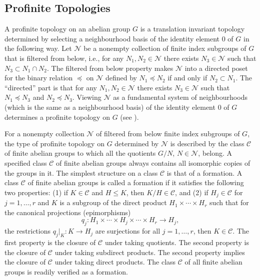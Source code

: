 \documentclass{amsart}
\theoremstyle{plain}
\theoremstyle{definition}
\theoremstyle{remark}
\begin{document}
\subsection{Profinite Topologies}

A profinite topology on an abelian group $G$ is a translation invariant topology determined by selecting a neighbourhood basis of the identity element $0$ of $G$ in the following way. Let ${\mathcal N}$ be a nonempty collection of finite index subgroups of $G$ that is filtered from below, i.e., for any $N_1,N_2\in{\mathcal N}$ there exists $N_3\in{\mathcal N}$ such that $N_3\subset N_1\cap N_2$. The filtered from below property makes ${\mathcal N}$ into a directed poset for the binary relation $\preceq$ on ${\mathcal N}$ defined by $N_1\preceq N_2$ if and only if $N_2 \subset N_1$. The ``directed'' part is that for any $N_1,N_2\in{\mathcal N}$ there exists $N_3\in{\mathcal N}$ such that $N_1\preceq N_3$ and $N_2\preceq N_3$. Viewing ${\mathcal N}$ as a fundamental system of neighbourhoods (which is the same as a neighbourhood basis) of the identity element $0$ of $G$ determines a profinite topology on $G$ (see \cite{Bo89}).

For a nonempty collection ${\mathcal N}$ of filtered from below finite index subgroups of $G$, the type of profinite topology on $G$ determined by ${\mathcal N}$ is described by the class ${\mathcal C}$ of finite abelian groups to which all the quotients $G/N$, $N\in {\mathcal N}$, belong. A specified class ${\mathcal C}$ of finite abelian groups always contains all isomorphic copies of the groups in it.  The simplest structure on a class ${\mathcal C}$ is that of a formation. A class ${\mathcal C}$ of finite abelian groups is called a formation if it satisfies the following two properties: (1) if $K\in {\mathcal C}$ and $H\leq K$, then $K/H\in {\mathcal C}$, and (2) if $H_j\in {\mathcal C}$ for $j=1,\dots,r$ and $K$ is a subgroup of the direct product $H_1\times\cdots\times H_r$ such that for the canonical projections (epimorphisms)
\[ q_j: H_1\times\cdots \times H_j\times\cdots\times H_r\to H_j,\]
the restrictions $q_j\vert_K:K\to H_j$ are surjections for all $j=1,\dots,r$, then $K\in {\mathcal C}$. The first property is the closure of ${\mathcal C}$ under taking quotients. The second property is the closure of ${\mathcal C}$ under taking subdirect products. The second property implies the closure of ${\mathcal C}$ under taking direct products. The class ${\mathcal C}$ of all finite abelian groups is readily verified as a formation.
\end{document}
